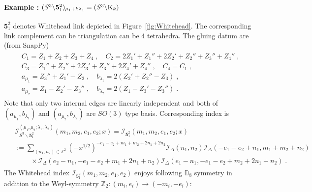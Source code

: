 \documentclass[a4paper,11pt]{article}
\def\cI{\mathcal{I}}
\begin{document}
\paragraph{Example : $(S^3\backslash \mathbf{5}^2_1)_{\mu_1  +k \lambda_1}  = (S^3\backslash {\rm K}_k)$} 
$\mathbf{5}^2_1$ denotes Whitehead link depicted in Figure~\ref{fig:Whitehead}. The corresponding link complement can be triangulation can be 4 tetrahedra. The gluing datum are (from SnapPy)
%
\begin{align}
\begin{split}
&C_1 = Z_1+Z_2+Z_3+Z_4 \;, \quad C_2 = 2Z_1'+Z_1''+2Z_2'+Z_2''+Z_3''+Z_4''\;, 
\\
&C_3 = Z_1''+Z_2''+2Z_3'+Z_3''+2Z_4'+Z_4''\;, \quad C_4 = C_1\;,
\\
&a_{\mu_1} = Z_3'' +Z_1'-Z_2\;, \quad b_{\lambda_1} = 2 (Z_2'+Z_2''-Z_3)\;, 
\\
&a_{\mu_2} = Z_1 - Z_2'-Z_3''\;, \quad b_{\lambda_2} = 2 (Z_1 -Z_3'-Z_3'')\;. \label{Gluing eqns for Whitehead}
\end{split}
\end{align}
%
Note that only two internal edges are linearly independent and both of $(a_{\mu_1}, b_{\lambda_1})$ and  $(a_{\mu_2}, b_{\lambda_2})$ are  $SO(3)$ type basis.
Corresponding index is 
%
\begin{align}
\begin{split}
&\cI_{S^3\backslash \mathbf{5}^2_1}^{(\mu_1, \mu_2 ; \lambda_1, \lambda_2)}(m_1, m_2, e_1, e_2;x) = \cI_{\mathbf{5}^2_1} (m_1, m_2,e_1,e_2;x)
\\
&:=\sum_{(n_1,n_2) \in \mathbb{Z}^2} (-x^{1/2})^{-e_1-e_2+m_1+m_2+2 n_1+2 n_2}
\cI_\Delta(n_1,n_2)  \cI_\Delta(-e_1-e_2+n_1,m_1+m_2+n_2)
\\
&\quad \quad \;  \times \cI_\Delta(e_2-n_1,-e_1-e_2+m_1+2 n_1+n_2)  \cI_\Delta(e_1-n_1,-e_1-e_2+m_2+2 n_1+n_2) \;.  \label{Whitehead index}
\end{split}
\end{align}
%
The Whitehead index $\cI_{\mathbf{5}^2_1}(m_1,m_2,e_1,e_2)$ enjoys following $\mathbb{D}_8$ symmetry in addition to the Weyl-symmetry  $\mathbb{Z}_2 : (m_i, e_i )\rightarrow (-m_i, -e_i)$: 
%
\end{document}
